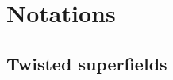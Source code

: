 \documentclass[epsfig,12pt]{article}
\begin{document}
\section{Notations}
\label{app:notations}


\subsection{Twisted superfields}
\end{document}
